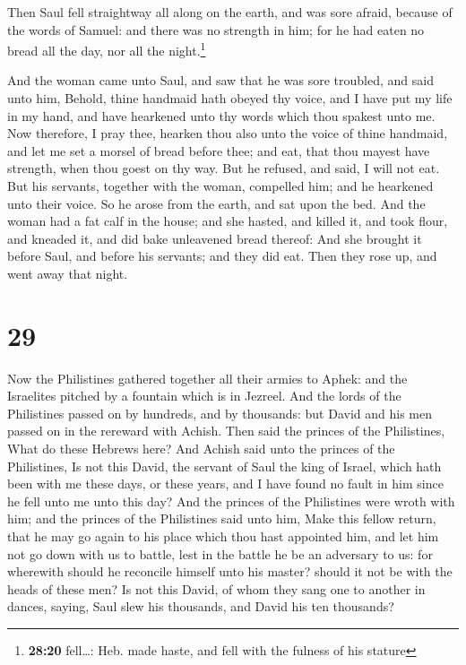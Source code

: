  Then Saul fell straightway all along on the earth, and
was sore afraid, because of the words of Samuel: and there was no
strength in him; for he had eaten no bread all the day, nor all the
night.\footnote{\textbf{28:20} fell\ldots: Heb. made haste, and fell
  with the fulness of his stature}

 And the woman came unto Saul, and saw that he was sore
troubled, and said unto him, Behold, thine handmaid hath obeyed thy
voice, and I have put my life in my hand, and have hearkened unto thy
words which thou spakest unto me.  Now therefore, I pray
thee, hearken thou also unto the voice of thine handmaid, and let me set
a morsel of bread before thee; and eat, that thou mayest have strength,
when thou goest on thy way.  But he refused, and said, I
will not eat. But his servants, together with the woman, compelled him;
and he hearkened unto their voice. So he arose from the earth, and sat
upon the bed.  And the woman had a fat calf in the house;
and she hasted, and killed it, and took flour, and kneaded it, and did
bake unleavened bread thereof:  And she brought it before
Saul, and before his servants; and they did eat. Then they rose up, and
went away that night.

\hypertarget{section-28}{%
\section{29}\label{section-28}}

 Now the Philistines gathered together all their armies to
Aphek: and the Israelites pitched by a fountain which is in Jezreel.
 And the lords of the Philistines passed on by hundreds,
and by thousands: but David and his men passed on in the rereward with
Achish.  Then said the princes of the Philistines, What do
these Hebrews here? And Achish said unto the princes of the Philistines,
Is not this David, the servant of Saul the king of Israel, which hath
been with me these days, or these years, and I have found no fault in
him since he fell unto me unto this day?  And the princes
of the Philistines were wroth with him; and the princes of the
Philistines said unto him, Make this fellow return, that he may go again
to his place which thou hast appointed him, and let him not go down with
us to battle, lest in the battle he be an adversary to us: for wherewith
should he reconcile himself unto his master? should it not be with the
heads of these men?  Is not this David, of whom they sang
one to another in dances, saying, Saul slew his thousands, and David his
ten thousands?

